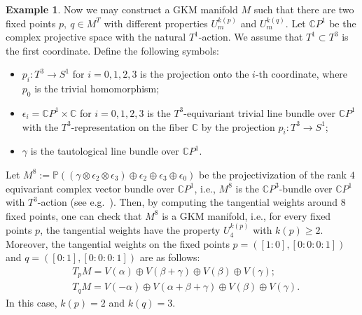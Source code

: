 \documentclass{amsart}
\theoremstyle{definition}
\newtheorem{example}[theorem]{Example}
\theoremstyle{remark}
\numberwithin{equation}{section}
\begin{document}
\begin{example}
\label{ex_depends_k(p)}
Now we may construct a GKM manifold $M$ 
such that there are two fixed points $p,\ q\in M^{T}$ with different properties $U_{m}^{k(p)}$ and $U_{m}^{k(q)}$.
Let $\mathbb{C}P^{1}$ be the complex projective space with the natural $T^{1}$-action.
We assume that $T^{1}\subset T^{3}$ is the first coordinate. 
Define the following symbols:
\begin{itemize}
\item $p_{i}:T^{3}\to S^{1}$ for $i=0,1,2,3$ is the projection onto the $i$-th coordinate, where $p_{0}$ is the trivial homomorphism;
\item $\epsilon_{i}=\mathbb{C}P^{1}\times \mathbb{C}$ for $i=0,1,2,3$ is the $T^{3}$-equivariant trivial line bundle over $\mathbb{C}P^{1}$ with the $T^{3}$-representation on the fiber $\mathbb{C}$ by the projection $p_{i}:T^{3}\to S^{1}$;
\item $\gamma$ is the tautological line bundle over $\mathbb{C}P^{1}$.
\end{itemize}
Let $M^{8}:=\mathbb{P}((\gamma\otimes \epsilon_{2}\otimes\epsilon_{3})\oplus \epsilon_{2}\oplus \epsilon_{3}\oplus \epsilon_{0})$ be the projectivization of the rank $4$ equivariant complex vector bundle over $\mathbb{C}P^{1}$, i.e., $M^{8}$ is the $\mathbb{C}P^{3}$-bundle over $\mathbb{C}P^{1}$ with $T^{3}$-action (see e.g.~\cite{KS}).
Then, 
by computing the tangential weights around $8$ fixed points, one can check that $M^{8}$ is a GKM manifold, i.e., for every fixed points $p$, the tangential weights have the property $U_{4}^{k(p)}$ with $k(p)\ge 2$.
Moreover, the tangential weights on the fixed points $p=([1:0],[0:0:0:1])$ 
and $q=([0:1],[0:0:0:1])$ are as follows:
\begin{align*}
& T_{p}M=V(\alpha)\oplus V(\beta+\gamma)\oplus V(\beta)\oplus V(\gamma); \\
& T_{q}M=V(-\alpha)\oplus V(\alpha+\beta+\gamma)\oplus V(\beta)\oplus V(\gamma).
\end{align*}
In this case, $k(p)=2$ and $k(q)=3$.
\end{example}
\end{document}
